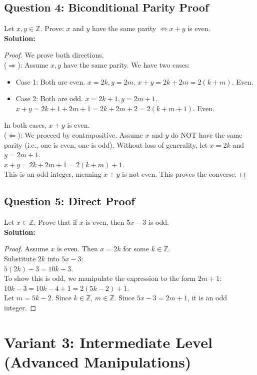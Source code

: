 \documentclass[11pt]{article}
\begin{document}
\subsection*{Question 4: Biconditional Parity Proof}
Let $x, y \in \mathbb{Z}$. Prove: $x$ and $y$ have the same parity $\Leftrightarrow x+y$ is even.\\
\textbf{Solution:}
\begin{proof}
We prove both directions. \\
($\Rightarrow$): Assume $x, y$ have the same parity. We have two cases:
\begin{itemize}
    \item Case 1: Both are even. $x = 2k, y = 2m$. $x+y = 2k+2m = 2(k+m)$. Even.
    \item Case 2: Both are odd. $x = 2k+1, y = 2m+1$. $x+y = 2k+1+2m+1 = 2k+2m+2 = 2(k+m+1)$. Even.
\end{itemize}
In both cases, $x+y$ is even. \\
($\Leftarrow$): We proceed by contrapositive. Assume $x$ and $y$ do NOT have the same parity (i.e., one is even, one is odd). Without loss of generality, let $x = 2k$ and $y = 2m+1$. \\
$x+y = 2k + 2m + 1 = 2(k+m) + 1$. \\
This is an odd integer, meaning $x+y$ is not even. This proves the converse.
\end{proof}

\subsection*{Question 5: Direct Proof}
Let $x \in \mathbb{Z}$. Prove that if $x$ is even, then $5x-3$ is odd.\\
\textbf{Solution:}
\begin{proof}
Assume $x$ is even. Then $x = 2k$ for some $k \in \mathbb{Z}$. \\
Substitute $2k$ into $5x - 3$: \\
$5(2k) - 3 = 10k - 3$. \\
To show this is odd, we manipulate the expression to the form $2m+1$: \\
$10k - 3 = 10k - 4 + 1 = 2(5k - 2) + 1$. \\
Let $m = 5k - 2$. Since $k \in \mathbb{Z}$, $m \in \mathbb{Z}$. Since $5x - 3 = 2m + 1$, it is an odd integer.
\end{proof}

\newpage
\section{Variant 3: Intermediate Level (Advanced Manipulations)}
\end{document}
